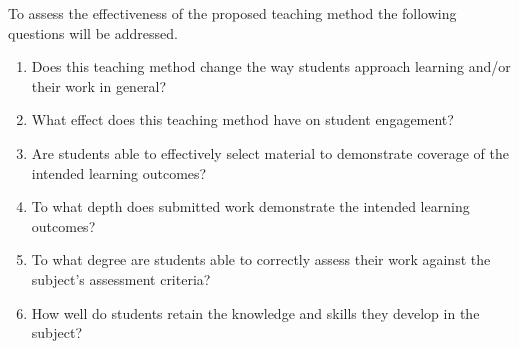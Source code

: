 To assess the effectiveness of the proposed teaching method the following questions will be addressed.

\begin{enumerate}
  \item Does this teaching method change the way students approach learning and/or their work in general?
  \item What effect does this teaching method have on student engagement?
  \item Are students able to effectively select material to demonstrate coverage of the intended learning outcomes?
  \item To what depth does submitted work demonstrate the intended learning outcomes?
  \item To what degree are students able to correctly assess their work against the subject's assessment criteria?
  \item How well do students retain the knowledge and skills they develop in the subject?
\end{enumerate}

